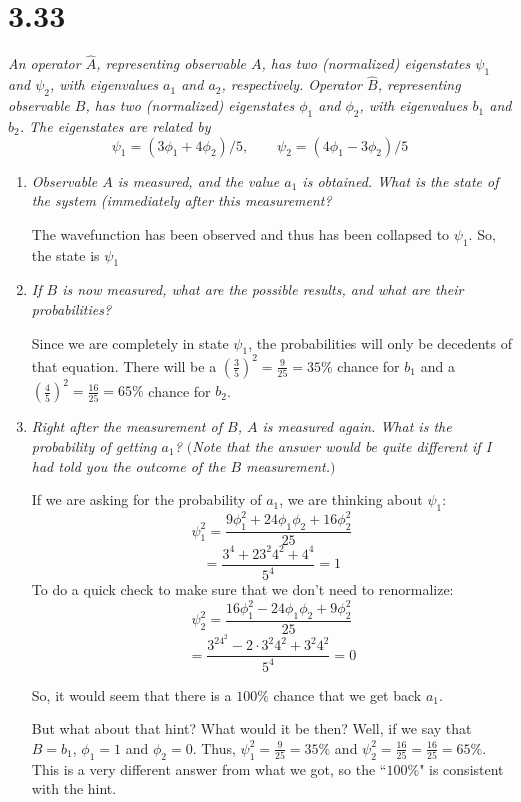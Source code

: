 \documentclass[12pt]{article}
\begin{document}
\newpage

\section*{3.33}
\emph{An operator $\hat{A}$, representing observable $A$, has two (normalized) eigenstates $\psi_1$ and $\psi_2$, with eigenvalues $a_1$ and $a_2$, respectively. Operator $\hat{B}$, representing observable $B$, has two (normalized) eigenstates $\phi_1$ and $\phi_2$, with eigenvalues $b_1$ and $b_2$. The eigenstates are related by}
\[\psi_1 = (3\phi_1 + 4\phi_2)/5, \qquad \psi_2 = (4\phi_1 - 3\phi_2)/5\]
\begin{enumerate}[label=\alph*)]
\item \emph{Observable $A$ is measured, and the value $a_1$ is obtained. What is the state of the system (immediately after this measurement?}\bigskip

The wavefunction has been observed and thus has been collapsed to $\psi_1$. So, the state is $\psi_1$

\item \emph{If $B$ is now measured, what are the possible results, and what are their probabilities?}\bigskip

Since we are completely in state $\psi_1$, the probabilities will only be decedents of that equation. There will be a $(\frac{3}{5})^2 = \frac{9}{25} = 35\%$ chance for $b_1$ and a   $(\frac{4}{5})^2 = \frac{16}{25} = 65\%$ chance for $b_2$.

\item \emph{Right after the measurement of $B$, $A$ is measured again. What is the probability of getting $a_1$? $($Note that the answer would be quite different if I had told you the outcome of the $B$ measurement.$)$}

If we are asking for the probability of $a_1$, we are thinking about $\psi_1$:
\[\psi_1^2 = \frac{9\phi_1^2 + 24\phi_1 \phi_2 + 16\phi_2^2}{25}\]
\[= \frac{3^4+ 23^2 4^2 + 4^4}{5^4} = 1\]
To do a quick check to make sure that we don't need to renormalize:
\[\psi_2^2 = \frac{16\phi_1^2 - 24\phi_1 \phi_2 + 9\phi_2^2}{25}\]
\[= \frac{3^24^2- 2\cdot3^2 4^2 + 3^2 4^2}{5^4} = 0\]

So, it would seem that there is a $100\%$ chance that we get back $a_1$. 

But what about that hint? What would it be then? Well, if we say that $B=b_1$, $\phi_1 = 1$ and $\phi_2 = 0$. Thus, $\psi_1^2 = \frac{9}{25} = 35\%$ and $\psi_2^2 = \frac{16}{25} = \frac{16}{25} = 65\%$. This is a very different answer from what we got, so the ``$100\%$" is consistent with the hint. 
\end{enumerate}
\end{document}
